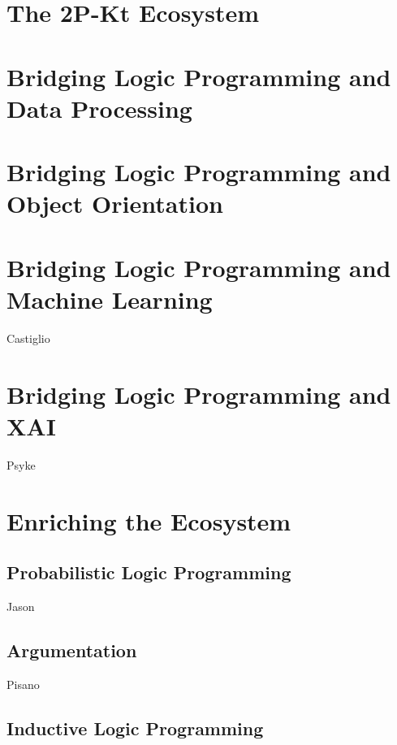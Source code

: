 \documentclass[12pt,a4paper,openright,twoside]{book}
\begin{document}
\cite{cco-softwarex-2021-2pkt}

\chapter{The 2P-Kt Ecosystem}

\cite{cco-softwarex-2021-2pkt}
\cite{kotlindsi4prolog-woa2020}

\chapter{Bridging Logic Programming and Data Processing}

\cite{2pkt-jelia2021}

\chapter{Bridging Logic Programming and Object Orientation}

\cite{cco-softwarex-2021-2pkt}
\cite{kotlindsi4prolog-woa2020}

\chapter{Bridging Logic Programming and Machine Learning}

Castiglio

\chapter{Bridging Logic Programming and XAI}

Psyke

\chapter{Enriching the Ecosystem}

\section{Probabilistic Logic Programming}

Jason

\section{Argumentation}

Pisano

\section{Inductive Logic Programming}
\end{document}
